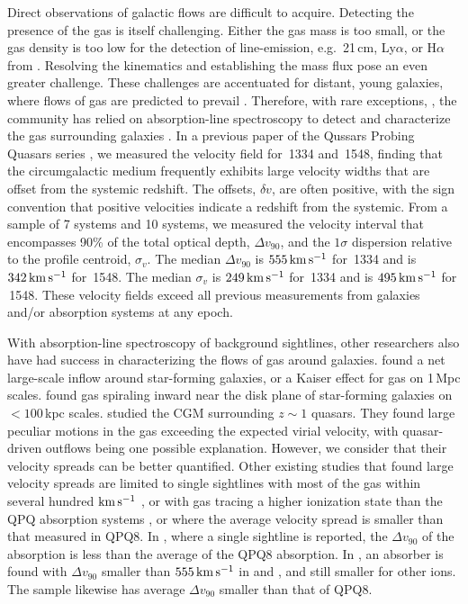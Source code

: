 \documentclass[iop]{emulateapj}
\begin{document}
Direct observations of galactic flows are difficult to acquire. Detecting the presence of 
the gas is itself challenging. Either the gas mass is too small, or the gas density is too low for 
the detection of line-emission, e.g.\ 21\,cm, Ly$\alpha$, or H$\alpha$ from . Resolving 
the kinematics and establishing the mass flux pose an even greater challenge. These challenges are 
accentuated for distant, young galaxies, where flows of gas are predicted to prevail 
\citep{Keres+09,Fumagalli+11}. Therefore, with rare exceptions, 
\citep[e.g.][]{Cantalupo+14,Hennawi+15}, the community has relied on absorption-line spectroscopy 
to detect and characterize the gas surrounding galaxies 
\citep[e.g.][]{BergeronBoisse91,Steidel+10,Prochaska+11,Tumlinson+13}. 
In a previous paper of the Qussars Probing Quasars series \citep[][, hereafter QPQ8]{QPQ8}, we 
measured the velocity field for \,1334 and \,1548, finding that the 
circumgalactic medium frequently exhibits large velocity widths that are offset from the systemic 
redshift. The offsets, $\delta v$, are often positive, with the sign convention that positive 
velocities indicate a redshift from the systemic. From a sample of 7  systems and 10 
 systems, we measured the velocity interval that encompasses 90\% of the total optical 
depth, $\Delta v_{90}$, and the $1\sigma$ dispersion relative to the profile centroid, $\sigma_v$. 
The median $\Delta v_{90}$ is $555\,{\rm km\,s^{-1}}$ for \,1334 and is 
$342\,{\rm km\,s^{-1}}$ for \,1548. The median $\sigma_v$ is $249\,{\rm km\,s^{-1}}$ for 
\,1334 and is $495\,{\rm km\,s^{-1}}$ for \,1548. These velocity fields exceed 
all previous measurements from galaxies and/or absorption systems at any epoch. 

With absorption-line spectroscopy of background sightlines, other researchers also have had 
success in characterizing the flows of gas around galaxies. \cite{Rakic+12} found a net 
large-scale inflow around star-forming galaxies, or a Kaiser effect for gas on 
1\,Mpc scales. \cite{Ho+17} found gas spiraling inward near the disk plane of 
star-forming galaxies on $<100$\,kpc scales. \cite{Johnson+15} studied the CGM surrounding 
$z\sim1$ quasars. They found large peculiar motions in the gas exceeding the expected virial 
velocity, with quasar-driven outflows being one possible explanation. However, we consider that 
their velocity spreads can be better quantified. Other 
existing studies that found large velocity spreads are limited to single sightlines with most of 
the gas within several hundred ${\rm km\,s^{-1}}$ \citep[e.g., ][]{Tripp+11,RudieNewmanMurphy17}, 
or with gas tracing 
a higher ionization state than the QPQ absorption systems \citep[e.g., ][]{Churchill+12}, or where 
the average velocity spread is smaller than that measured in QPQ8. In \cite{Gauthier+13}, where a 
single sightline is reported, the $\Delta v_{90}$ of the  absorption is less than the 
average of the QPQ8  absorption. In \cite{Muzahid+15}, an absorber is found with 
$\Delta v_{90}$ smaller than $555\,{\rm km\,s^{-1}}$ in  and , and still 
smaller for other ions. The \cite{Zahedy+16} sample likewise has average $\Delta v_{90}$ smaller 
than that of QPQ8. 
\end{document}
